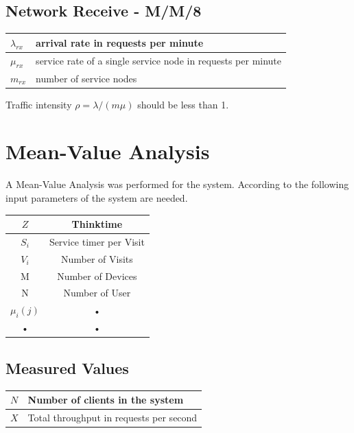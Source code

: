 \documentclass[a4paper]{article}
\begin{document}
\subsection{Network Receive - M/M/8}

\begin{tabular}{|l|l|}
\hline 
$\lambda_{rx}$ & arrival rate in requests per minute \\
\hline 
$\mu_{rx}$ & service rate of a single service node in requests per minute \\
\hline 
$m_{rx}$ & number of service nodes \\
\hline 
\end{tabular}

Traffic intensity $\rho = {\lambda} / {(m \mu)}$ should be less than 1.


\section{Mean-Value Analysis}

A Mean-Value Analysis was performed for the system. According to \cite[Box 31.2]{Raj} the following input parameters of the system are needed.

\begin{tabular}{|c|c|}
\hline 
$Z$ & Thinktime \\ 
\hline 
$S_i$ & Service timer per Visit \\ 
\hline 
$V_i$ & Number of Visits \\ 
\hline 
M & Number of Devices \\ 
\hline 
N & Number of User \\ 
\hline 
$\mu_i(j)$ & • \\ 
\hline 
• & • \\ 
\hline 
\end{tabular} 



\subsection{Measured Values}

\begin{tabular}{|l|l|}
\hline 
$N$ & Number of clients in the system \\ 
\hline 
$X$ & Total throughput in requests per second \\ 
\hline 
\end{tabular} 
\end{document}

